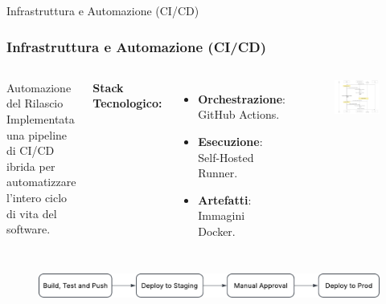 \documentclass[8pt]{beamer}
\begin{document}
\begin{frame}{Infrastruttura e Automazione (CI/CD)}
  \frametitle{Infrastruttura e Automazione (CI/CD)}

  \begin{columns}[T]
    \begin{block}{Automazione del Rilascio}
      Implementata una pipeline di CI/CD ibrida per automatizzare l'intero ciclo di vita del software.
    \end{block}

    \textbf{Stack Tecnologico:}
    \begin{itemize}
      \item \textbf{Orchestrazione}: GitHub Actions.
      \item \textbf{Esecuzione}: Self-Hosted Runner.
      \item \textbf{Artefatti}: Immagini Docker.
    \end{itemize}

    \begin{figure}
      \includegraphics[width=\textwidth]{figures/pipeline_sequence.pdf}
    \end{figure}
  \end{columns}

  \vfill %

  \begin{center}
    \begin{figure}
      \includegraphics[width=\textwidth]{figures/workflow.pdf}
    \end{figure}
  \end{center}

\end{frame}
\end{document}
